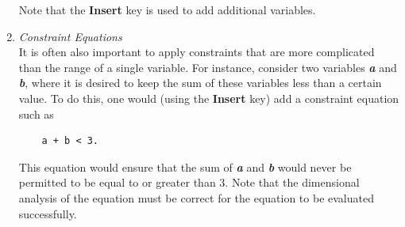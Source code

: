 \begin{enumerate}
    Note that the \textbf{Insert} key is used to add additional variables.

  \item \textit{Constraint Equations}\\
    It is often also important to apply constraints that are more complicated
    than the range of a single variable.  For instance, consider two variables
    \textbf{\textit{a}} and \textbf{\textit{b}}, where it is desired to keep the
    sum of these variables less than a certain value.  To do this, one would
    (using the \textbf{Insert} key) add a constraint equation such as
    \begin{lstlisting}
    a + b < 3.
    \end{lstlisting}
    This equation would ensure that the sum of \textbf{\textit{a}} and
    \textbf{\textit{b}} would never be permitted to be equal to or greater than
    $3$.
    Note that the dimensional analysis of the equation must be correct for the
    equation to be evaluated successfully.
\end{enumerate}
